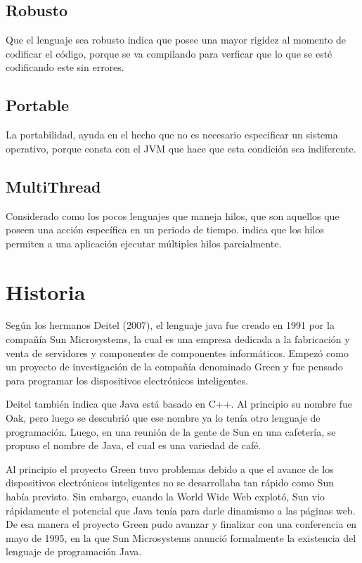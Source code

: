 \documentclass[12pt]{book} %
\begin{document}
\section{Robusto}
Que el lenguaje sea robusto indica que posee una mayor rigidez al momento de codificar el c\'odigo, porque se va compilando para verficar que lo que se est\'e codificando este sin errores.
\section{Portable}
La portabilidad, ayuda en el hecho que no es necesario especificar un sistema operativo, porque consta con el JVM que hace que esta condici\'on sea indiferente.
\section{MultiThread}
Considerado como los pocos lenguajes que maneja hilos, que son aquellos que poseen una acci\'on espec\'ifica en un periodo de tiempo. \cite{thread} indica que los hilos permiten a una aplicaci\'on ejecutar m\'ultiples hilos parcialmente.

\chapter{Historia}
Según los hermanos Deitel (2007), el lenguaje java fue creado en 1991 por la compañía Sun Microsystems, la cual es una empresa dedicada a la fabricación y venta de servidores y componentes de componentes informáticos. Empezó como un proyecto de investigación de la compañía denominado Green y fue pensado para programar los dispositivos electrónicos inteligentes.

Deitel también indica que Java está basado en C++. Al principio su nombre fue Oak, pero luego se descubrió que ese nombre ya lo tenía otro lenguaje de programación. Luego, en una reunión de la gente de Sun en una cafetería, se propuso el nombre de Java, el cual es una variedad de café.

Al principio el proyecto Green tuvo problemas debido a que el avance de los dispositivos electrónicos inteligentes no se desarrollaba tan rápido como Sun había previsto. Sin embargo, cuando la World Wide Web explotó, Sun vio rápidamente el potencial que Java tenía para darle dinamismo a las páginas web. De esa manera el proyecto Green pudo avanzar y finalizar con una conferencia en mayo de 1995, en la que Sun Microsystems anunció formalmente la existencia del lenguaje de programación Java. 
\end{document}
